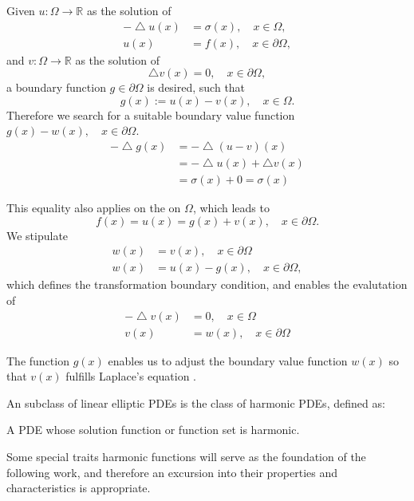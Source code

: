 \begin{example}
Given $u:\Omega \rightarrow \mathbb{R}$ as the solution of
\begin{equation}
  \begin{aligned}
  - \bigtriangleup u(x) &= \sigma(x), \quad x \in \Omega,
  \\ u(x) &= f(x), \quad x \in \partial \Omega,
\end{aligned}
\end{equation}
and $v:\Omega \rightarrow \mathbb{R}$ as the solution of
\begin{equation}
  \bigtriangleup v(x) = 0,\quad x\in\partial\Omega,
\end{equation}
a boundary function $g\in\partial\Omega$ is desired, such that
\begin{equation}
  g(x):=u(x)-v(x), \quad x \in \Omega.
\end{equation}
Therefore we search for a suitable boundary value function $g(x) - w(x), \quad x \in \partial \Omega$.
\begin{equation}
  \begin{aligned}
- \bigtriangleup g(x) &= - \bigtriangleup (u-v)(x) \\
&= - \bigtriangleup u(x) + \bigtriangleup v(x)
\\&= \sigma(x) + 0 = \sigma(x)
\end{aligned}
\end{equation}

This equality also applies on the on $\Omega$, which leads to
\begin{equation}
f(x) = u(x) = g(x) + v(x), \quad x \in \partial \Omega.
\end{equation}
We stipulate
\begin{equation}
\begin{aligned}
  w(x) &= v(x), \quad x \in \partial \Omega\\
  w(x) &= u(x) - g(x) , \quad x \in \partial \Omega,
\end{aligned}
\end{equation}
which defines the transformation boundary condition, and enables the evalutation of
\begin{equation}
  \begin{aligned}
  -\bigtriangleup v(x) &= 0, \quad x \in \Omega\\
  v(x)&=w(x), \quad x \in \partial \Omega
\end{aligned}
\end{equation}

The function $g(x)$  enables us to adjust the boundary value function $w(x)$
so that $v(x)$ fulfills Laplace's equation
\cite{Bornemann}.


\end{example}
An subclass of linear elliptic \Glspl{PDE} is the class of harmonic \Glspl{PDE}, defined as:
\begin{definition}
  A \Gls{PDE} whose solution function or function set is harmonic.
\end{definition}
Some special traits harmonic functions will serve as the foundation of the
 following work, and therefore an excursion into their properties and characteristics
is appropriate.

